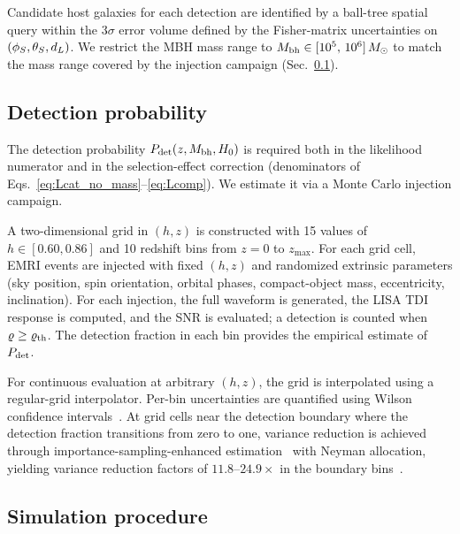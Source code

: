 Candidate host galaxies for each detection are identified by a ball-tree
spatial query within the $3\sigma$ error volume defined by the Fisher-matrix
uncertainties on $(\phi_S, \theta_S, d_L)$.
We restrict the MBH mass range to
$M_\mathrm{bh} \in [10^5,\, 10^6]\,M_\odot$
to match the mass range covered by the injection campaign
(Sec.~\ref{sec:pdet}).

\subsection{Detection probability}
\label{sec:pdet}

The detection probability $P_\mathrm{det}(z, M_\mathrm{bh}, H_0)$ is required both in the
likelihood numerator and in the selection-effect correction
(denominators of Eqs.~\eqref{eq:Lcat_no_mass}--\eqref{eq:Lcomp}).
We estimate it via a Monte Carlo injection campaign.

A two-dimensional grid in $(h, z)$ is constructed with 15 values of
$h \in [0.60, 0.86]$ and 10 redshift bins from $z = 0$ to $z_\mathrm{max}$.
For each grid cell, EMRI events are injected with fixed $(h, z)$ and
randomized extrinsic parameters (sky position, spin orientation,
orbital phases, compact-object mass, eccentricity, inclination).
For each injection, the full waveform is generated, the LISA TDI response
is computed, and the SNR is evaluated; a detection is counted when
$\varrho \geq \varrho_\mathrm{th}$.
The detection fraction in each bin provides the empirical estimate of
$P_\mathrm{det}$.

For continuous evaluation at arbitrary $(h, z)$, the grid is interpolated
using a regular-grid interpolator.  Per-bin uncertainties are quantified
using Wilson confidence intervals~\cite{Wilson:1927}.
At grid cells near the detection boundary where the detection fraction
transitions from zero to one, variance reduction is achieved through
importance-sampling-enhanced
estimation~\cite{Tiwari:2017ndi} with Neyman allocation, yielding
variance reduction factors of $11.8$--$24.9\times$ in the boundary
bins~\cite{Farr:2019rap}.

\subsection{Simulation procedure}
\label{sec:procedure}

